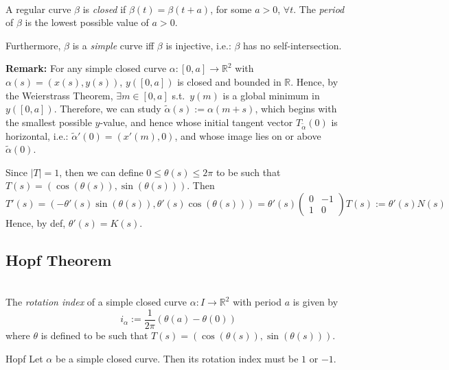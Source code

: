 \\
A regular curve $\beta$ is \textit{closed} if $\beta(t) = \beta(t+a)$, for some $a>0$, $\forall t$. The \textit{period} of $\beta$ is the lowest possible value of $a>0$. 

Furthermore, $\beta$ is a \textit{simple} curve iff $\beta$ is injective, i.e.: $\beta$ has no self-intersection.

\noindent\textbf{Remark:} For any simple closed curve $\alpha:[0,a]\to\mathbb{R}^2$ with $\alpha(s)=(x(s),y(s))$, $y([0,a])$ is closed and bounded in $\mathbb{R}$. Hence, by the Weierstrass Theorem, $\exists m\in [0,a]$ s.t.\ $y(m)$ is a global minimum in $y([0,a])$. Therefore, we can study $\tilde{\alpha}(s):=\alpha(m+s)$, which begins with the smallest possible $y$-value, and hence whose initial tangent vector $T_{\tilde{\alpha}}(0)$ is horizontal, i.e.: $\tilde{\alpha}'(0)=(x'(m),0)$, and whose image lies on or above $\tilde{\alpha}(0)$.

\noindent Since $|T|=1$, then we can define $0\le \theta(s) \le 2\pi$ to be such that $T(s) = (\cos(\theta(s)), \sin(\theta(s)))$. Then
\[
T'(s) = \left(-\theta'(s)\sin(\theta(s)), \theta'(s)\cos(\theta(s))\right) = \theta'(s)\begin{pmatrix} 0 & -1 \\ 1 & 0 \end{pmatrix} T(s) := \theta'(s)N(s)
\]
Hence, by def, $\theta'(s) = K(s)$.

\subsection{Hopf Theorem}

\\
The \textit{rotation index} of a simple closed curve $\alpha:I\to\mathbb{R}^2$ with period $a$ is given by
\[
i_\alpha := \frac{1}{2\pi} (\theta(a) - \theta(0))
\]
where $\theta$ is defined to be such that $T(s) = (\cos(\theta(s)), \sin(\theta(s)))$.

\begin{theorem}{Hopf}
Let $\alpha$ be a simple closed curve. Then its rotation index must be $1$ or $-1$.
\end{theorem}

